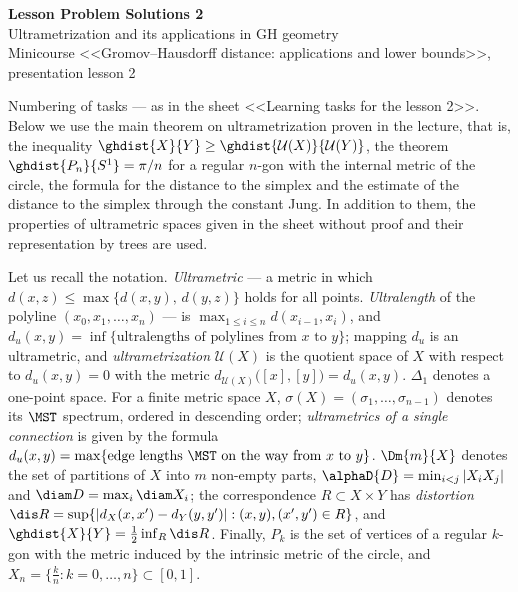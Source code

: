 \documentclass[a4paper,12pt]{report}
\begin{document}
\begin{center}
{\Large\bfseries Lesson Problem Solutions \textup{2}}\\[2mm]
{\large Ultrametrization and its applications in GH geometry}\\[2mm]
{\small Minicourse <<Gromov--Hausdorff distance: applications and lower bounds>>, presentation lesson \textup{2}}
\end{center}

Numbering of tasks --- as in the sheet <<Learning tasks for the lesson \textup{2}>>. Below we use the main theorem on ultrametrization proven in the lecture, that is, the inequality $\ghdist{X}{Y}\ge\ghdist{\mathcal U(X)}{\mathcal U(Y)}$, the theorem $\ghdist{P_n}{S^1}=\pi/n$ for a regular $n$-gon with the internal metric of the circle, the formula for the distance to the simplex and the estimate of the distance to the simplex through the constant Jung. In addition to them, the properties of ultrametric spaces given in the sheet without proof and their representation by trees are used.

Let us recall the notation. \emph{Ultrametric} --- a metric in which $d(x,z)\le\max\{d(x,y),\,d(y,z)\}$ holds for all points. \emph{Ultralength} of the polyline $(x_0,x_1,\dots,x_n)$ --- is $\max_{1\le i\le n}d(x_{i-1},x_i)$, and $d_u(x,y)=\inf\{\text{ultralengths of polylines from }x\text{ to }y\}$\textup{;} mapping $d_u$ is an ultrametric, and \emph{ultrametrization} $\mathcal U(X)$ is the quotient space of $X$ with respect to $d_u(x,y)=0$ with the metric $d_{\mathcal U(X)}\bigl([x],[y]\bigr)=d_u(x,y)$. $\Delta_1$ denotes a one-point space. For a finite metric space $X$, $\sigma(X)=(\sigma_1,\dots,\sigma_{n-1})$ denotes its $\MST$ spectrum, ordered in descending order\textup{;} \emph{ultrametrics of a single connection} is given by the formula $d_u(x,y)=\max\{\text{edge lengths } \MST \text{ on the way from } x \text{ to } y\}$. $\Dm{m}{X}$ denotes the set of partitions of $X$ into $m$ non-empty parts, $\alphaD{D}=\min_{i<j}|X_iX_j|$ and $\diam D=\max_i\diam X_i$\textup{;} the correspondence $R\subset X\times Y$ has \emph{distortion} $\dis R=\sup\{|d_X(x,x')-d_Y(y,y')|:(x,y),(x',y')\in R\}$, and $\ghdist{X}{Y}=\frac12\inf_R\dis R$. Finally, $P_k$ is the set of vertices of a regular $k$-gon with the metric induced by the intrinsic metric of the circle, and $X_n=\{\frac{k}{n}:k=0,\dots,n\}\subset[0,1]$.
\end{document}
